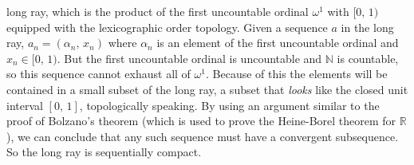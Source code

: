\documentclass{article}
\theoremstyle{plain}
\theoremstyle{normal}
\begin{document}
\begin{itemize}
                long ray, which is the product of the first uncountable
                ordinal $\omega^{1}$ with $[0,\,1)$ equipped with the
                lexicographic order topology. Given a sequence $a$ in the long
                ray, $a_{n}=(\alpha_{n},\,x_{n})$ where $\alpha_{n}$ is an
                element of the first uncountable ordinal and $x_{n}\in[0,\,1)$.
                But the first uncountable ordinal is uncountable and
                $\mathbb{N}$ is countable, so this sequence cannot exhaust all
                of $\omega^{1}$. Because of this the elements will be
                contained in a small subset of the long ray, a subset that
                \textit{looks} like the closed unit interval $[0,\,1]$,
                topologically speaking. By using an argument similar to
                the proof of Bolzano's theorem (which is used to prove the
                Heine-Borel theorem for $\mathbb{R}$), we can conclude that
                any such sequence must have a convergent subsequence. So the
                long ray is sequentially compact.
        \end{itemize}
\end{document}
